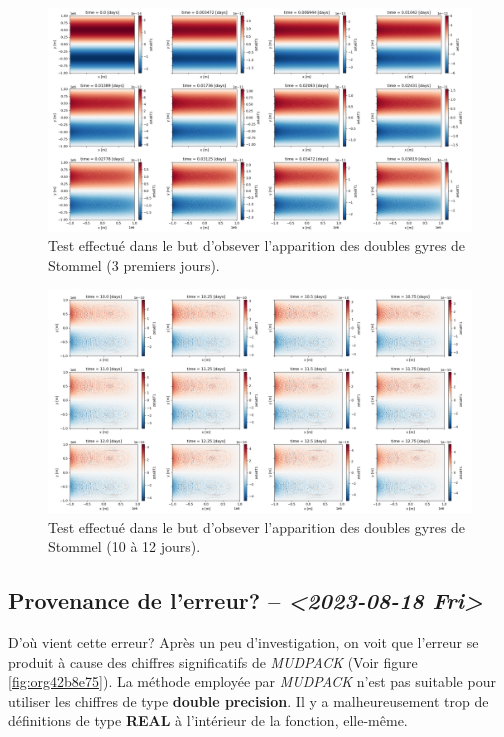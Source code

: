 \documentclass[10pt]{report}
\numberwithin{equation}{section}
\begin{document}
\begin{figure}[htbp]
\centering
\includegraphics[width=.9\linewidth]{figures/debuggage/2023_08_23_zetaBT_4filesperdays.png}
\caption{\label{fig:orga785454}Test effectué dans le but d'obsever l'apparition des doubles gyres de Stommel (3 premiers jours).}
\end{figure}

\begin{figure}[htbp]
\centering
\includegraphics[width=.9\linewidth]{figures/debuggage/2023_08_23_zetaBT_4filesperdays2.png}
\caption{\label{fig:org86d8968}Test effectué dans le but d'obsever l'apparition des doubles gyres de Stommel (10 à 12 jours).}
\end{figure}


\subsection{Provenance de l'erreur? -- \textit{<2023-08-18 Fri>}}
\label{sec:orgcb633a0}
D'où vient cette erreur?
Après un peu d'investigation, on voit que l'erreur se produit à cause des chiffres significatifs de \emph{MUDPACK} (Voir figure \ref{fig:org42b8e75}).
La  méthode employée par \emph{MUDPACK} n'est pas suitable pour utiliser les chiffres de type \textbf{double precision}.
Il y a malheureusement trop de définitions de type \textbf{REAL} à l'intérieur de la fonction, elle-même.
\end{document}
